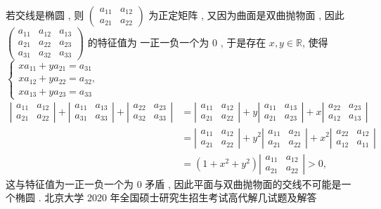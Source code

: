 \documentclass[10pt]{article}
\begin{document}
 若交线是椭圆 ,  则  $\left(\begin{array}{ll}a_{11} & a_{12} \\ a_{21} & a_{22}\end{array}\right)$  为正定矩阵 ,  又因为曲面是双曲抛物面 ,  因此  $\left(\begin{array}{lll}a_{11} & a_{12} & a_{13} \\ a_{21} & a_{22} & a_{23} \\ a_{31} & a_{32} & a_{33}\end{array}\right)$  的特征值为   一正一负一个为  0 ,  于是存在  $x, y \in \mathbb{R}$,  使得  $\left\{\begin{array}{l}x a_{11}+y a_{21}=a_{31} \\ x a_{12}+y a_{22}=a_{32} \text {, } \\ x a_{13}+y a_{23}=a_{33}\end{array}\right.$
$$
\begin{aligned}
\left|\begin{array}{ll}
a_{11} & a_{12} \\
a_{21} & a_{22}
\end{array}\right|+\left|\begin{array}{ll}
a_{11} & a_{13} \\
a_{31} & a_{33}
\end{array}\right|+\left|\begin{array}{ll}
a_{22} & a_{23} \\
a_{32} & a_{33}
\end{array}\right| &=\left|\begin{array}{ll}
a_{11} & a_{12} \\
a_{21} & a_{22}
\end{array}\right|+y\left|\begin{array}{ll}
a_{11} & a_{13} \\
a_{21} & a_{23}
\end{array}\right|+x\left|\begin{array}{ll}
a_{22} & a_{23} \\
a_{12} & a_{13}
\end{array}\right| \\
&=\left|\begin{array}{ll}
a_{11} & a_{12} \\
a_{21} & a_{22}
\end{array}\right|+y^{2}\left|\begin{array}{ll}
a_{11} & a_{21} \\
a_{21} & a_{22}
\end{array}\right|+x^{2}\left|\begin{array}{ll}
a_{22} & a_{12} \\
a_{12} & a_{11}
\end{array}\right| \\
&=\left(1+x^{2}+y^{2}\right)\left|\begin{array}{ll}
a_{11} & a_{12} \\
a_{21} & a_{22}
\end{array}\right|>0,
\end{aligned}
$$
 这与特征值为一正一负一个为  0  矛盾 ,  因此平面与双曲抛物面的交线不可能是一个椭圆 .  北京大学  2020  年全国硕士研究生招生考试高代解几试题及解答 
\end{document}
